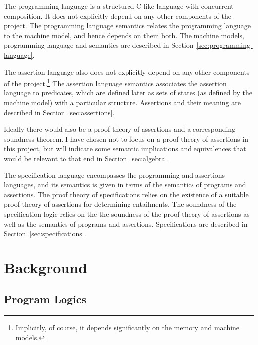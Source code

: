 \documentclass[11pt]{report}
\begin{document}
The programming language is a structured C-like language with concurrent composition. It does not explicitly depend on any other components of the project. The programming language semantics relates the programming language to the machine model, and hence depends on them both. The machine models, programming language and semantics are described in Section~\ref{sec:programming-language}. 

The assertion language also does not explicitly depend on any other components of the project.\footnote{Implicitly, of course, it depends significantly on the memory and machine models.} The assertion language semantics associates the assertion language to predicates, which are defined later as sets of states (as defined by the machine model) with a particular structure. Assertions and their meaning are described in Section~\ref{sec:assertions}. 

Ideally there would also be a proof theory of assertions and a corresponding soundness theorem. I have chosen not to focus on a proof theory of assertions in this project, but will indicate some semantic implications and equivalences that would be relevant to that end in Section~\ref{sec:algebra}.

The specification language encompasses the programming and assertions languages, and its semantics is given in terms of the semantics of programs and assertions. The proof theory of specifications relies on the existence of a suitable proof theory of assertions for determining entailments. The soundness of the specification logic relies on the the soundness of the proof theory of assertions as well as the semantics of programs and assertions. Specifications are described in Section~\ref{sec:specifications}.

\chapter{Background}

\section{Program Logics}
\label{sec:program-logics}
\end{document}
